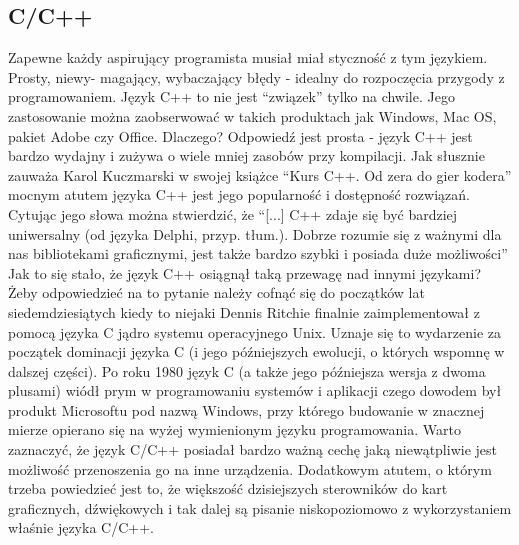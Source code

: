 \documentclass{article}
\begin{document}
\subsection{C/C++}
Zapewne każdy aspirujący programista musiał miał styczność z tym językiem. Prosty, niewy- magający, wybaczający błędy - idealny do rozpoczęcia przygody z programowaniem. Język C++ to nie jest “związek” tylko na chwile. Jego zastosowanie można zaobserwować w takich produktach jak Windows, Mac OS, pakiet Adobe czy Office. Dlaczego? Odpowiedź jest prosta - język C++ jest bardzo wydajny i zużywa o wiele mniej zasobów przy kompilacji. Jak słusznie zauważa Karol Kuczmarski w swojej książce “Kurs C++. Od zera do gier kodera” \cite{ref10} mocnym atutem języka C++ jest jego popularność i dostępność rozwiązań. Cytując jego słowa można stwierdzić, że “[...] C++ zdaje się być bardziej uniwersalny (od języka Delphi, przyp. tłum.). Dobrze rozumie się z ważnymi dla nas bibliotekami graficznymi, jest także bardzo szybki i posiada duże możliwości” Jak to się stało, że język C++ osiągnął taką przewagę nad innymi językami? Żeby odpowiedzieć na to pytanie należy cofnąć się do początków lat siedemdziesiątych kiedy to niejaki Dennis Ritchie finalnie zaimplementował z pomocą języka C jądro systemu operacyjnego Unix. Uznaje się to wydarzenie za początek dominacji języka C (i jego późniejszych ewolucji, o których 
wspomnę w dalszej części). Po roku 1980 język C (a także jego późniejsza wersja z dwoma plusami) wiódł prym w programowaniu systemów i aplikacji czego dowodem był produkt Microsoftu pod nazwą Windows, przy którego budowanie w znacznej mierze opierano się na wyżej wymienionym języku programowania. Warto zaznaczyć, że język C/C++ posiadał bardzo ważną cechę jaką niewątpliwie jest możliwość przenoszenia go na inne urządzenia. Dodatkowym atutem, o którym trzeba powiedzieć jest to, że większość dzisiejszych sterowników do kart graficznych, dźwiękowych i tak dalej są pisanie niskopoziomowo z wykorzystaniem właśnie języka C/C++.
\end{document}
